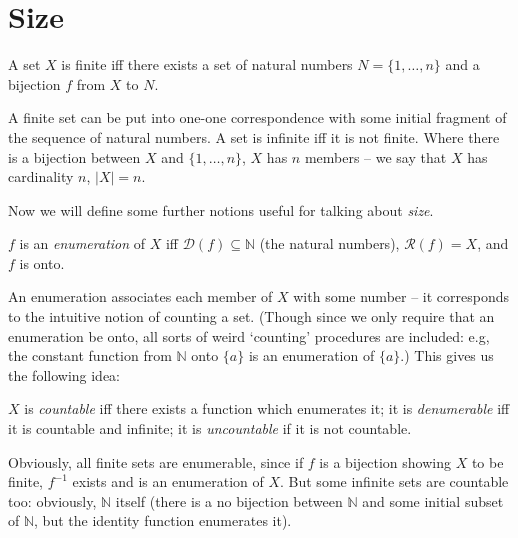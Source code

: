 \section{Size}

\begin{definition}[Finite]
  A set $X$ is finite iff there exists a set of natural numbers $N = \{1,\ldots,n\}$ and a bijection $f$ from $X$ to $N$.
\end{definition} A finite set can be put into one-one correspondence with some initial fragment of the sequence of natural numbers. A set is infinite iff it is not finite. Where there is a bijection between $X$ and $\{1,\ldots,n\}$, $X$ has $n$ members – we say that $X$ has cardinality $n$, $|X|=n$.

Now we will define some further notions useful for talking about \emph{size}.
\begin{definition}[Enumeration] $f$ is an \emph{enumeration} of $X$ iff $\mathcal{D}(f) \subseteq \mathbb{N}$ (the natural numbers), $\mathcal{R}(f) = X$, and $f$ is onto.
\end{definition} An enumeration associates each member of $X$ with some number – it corresponds to the intuitive notion of counting a set. (Though since we only require that an enumeration be onto, all sorts of weird `counting' procedures are included: e.g, the constant function from $\mathbb{N}$ onto $\{a\}$ is an enumeration of $\{a\}$.) This gives us the following idea: 
\begin{definition}[{[Un]}Countable] $X$ is \emph{countable} iff there exists a function which enumerates it; it is \emph{denumerable} iff it is countable and infinite; it is \emph{uncountable} if it is not countable.
\end{definition}
Obviously, all finite sets are enumerable, since if $f$ is a bijection showing $X$ to be finite, $f^{-1}$ exists and is an enumeration of $X$. But some infinite sets are countable too: obviously, $\mathbb{N}$ itself (there is a no bijection between $\mathbb{N}$ and some initial subset of $\mathbb{N}$, but the identity function enumerates it).

